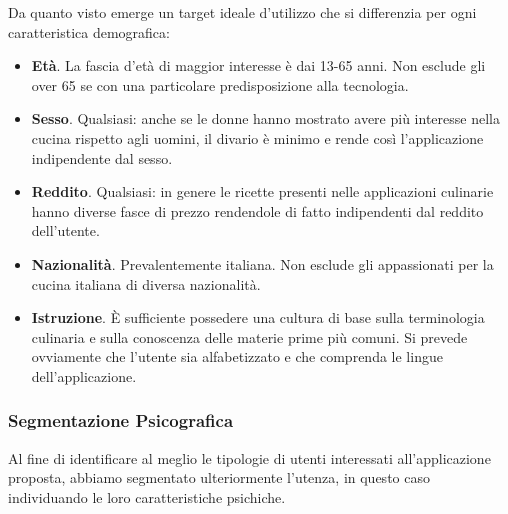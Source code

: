 Da quanto visto emerge un target ideale d'utilizzo che si differenzia per ogni
caratteristica demografica:
\begin{itemize}
\item \textbf{Età}. La fascia d'età di maggior interesse è dai 13-65
anni. Non esclude gli over 65 se con una particolare predisposizione
alla tecnologia.
\item \textbf{Sesso}. Qualsiasi: anche se le donne hanno mostrato avere più
interesse nella cucina rispetto agli uomini, il divario è minimo e rende
così l'applicazione indipendente dal sesso.
\item \textbf{Reddito}. Qualsiasi:
in genere le ricette presenti nelle applicazioni culinarie hanno diverse
fasce di prezzo rendendole di fatto indipendenti dal reddito dell'utente.
\item \textbf{Nazionalità}. Prevalentemente italiana. Non esclude gli
appassionati per la cucina italiana di diversa nazionalità.
\item \textbf{Istruzione}. È sufficiente possedere una cultura di base sulla terminologia
culinaria e sulla conoscenza delle materie prime più comuni. Si prevede
ovviamente che l'utente sia alfabetizzato e che comprenda le lingue
dell'applicazione. 

\end{itemize}

\subsubsection{Segmentazione Psicografica}
Al fine di identificare al meglio le tipologie di
utenti interessati all'applicazione proposta, abbiamo segmentato
ulteriormente l'utenza, in questo caso individuando le loro caratteristiche
psichiche.

